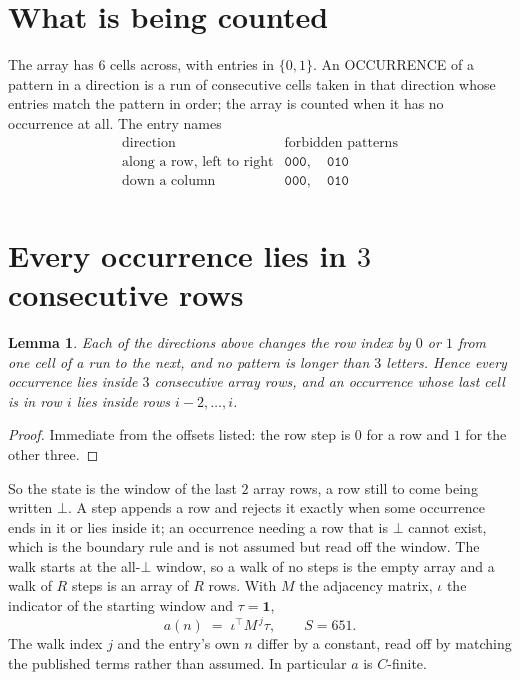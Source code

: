 \documentclass[11pt,a4paper]{article}
\theoremstyle{plain}
\newtheorem{lemma}[theorem]{Lemma}
\theoremstyle{definition}
\begin{document}
\section{What is being counted}

The array has $6$ cells across, with entries in $\{0,1\}$. An OCCURRENCE of a pattern in a
direction is a run of consecutive cells taken in that direction whose entries match the pattern
in order; the array is counted when it has no occurrence at all. The entry names
\[
\begin{array}{ll}
\text{direction} & \text{forbidden patterns} \\[2pt]
\text{along a row, left to right} & \mathtt{000},\quad \mathtt{010} \\
\text{down a column} & \mathtt{000},\quad \mathtt{010} \\
\end{array}
\]


\section{Every occurrence lies in $3$ consecutive rows}

\begin{lemma}\label{lem:win}
Each of the directions above changes the row index by $0$ or $1$ from one cell of a run to the
next, and no pattern is longer than $3$ letters. Hence every occurrence lies inside $3$
consecutive array rows, and an occurrence whose last cell is in row $i$ lies inside rows
$i-2,\dots,i$.
\end{lemma}

\begin{proof}
Immediate from the offsets listed: the row step is $0$ for a row and $1$ for the other three.
\end{proof}

So the state is the window of the last $2$ array rows, a row still to come being written
$\bot$. A step appends a row and rejects it exactly when some occurrence ends in it or lies
inside it; an occurrence needing a row that is $\bot$ cannot exist, which is the boundary rule
and is not assumed but read off the window. The walk starts at the all-$\bot$ window, so a walk
of no steps is the empty array and a walk of $R$ steps is an array of $R$ rows. With $M$ the
adjacency matrix, $\iota$ the indicator of the starting window and $\tau=\mathbf{1}$,
\[
a(n)\;=\;\iota^{\!\top}M^{\,j}\tau ,\qquad S=651.
\]
The walk index $j$ and the entry's own $n$ differ by a constant, read off by matching the
published terms rather than assumed. In particular $a$ is $C$-finite.
\end{document}
